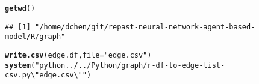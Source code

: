 \documentclass{article}\usepackage[]{graphicx}\usepackage[]{color}
\makeatletter
\newcommand{\hlstr}[1]{\textcolor[rgb]{0.192,0.494,0.8}{#1}}%
\newcommand{\hlstd}[1]{\textcolor[rgb]{0.345,0.345,0.345}{#1}}%
\newcommand{\hlkwc}[1]{\textcolor[rgb]{0.333,0.667,0.333}{#1}}%
\newcommand{\hlkwd}[1]{\textcolor[rgb]{0.737,0.353,0.396}{\textbf{#1}}}%
\newenvironment{kframe}{%
 \def\at@end@of@kframe{}%
 \ifinner\ifhmode%
  \def\at@end@of@kframe{\end{minipage}}%
  \begin{minipage}{\columnwidth}%
 \fi\fi%
 \def\FrameCommand##1{\hskip\@totalleftmargin \hskip-\fboxsep
 \colorbox{shadecolor}{##1}\hskip-\fboxsep
     \hskip-\linewidth \hskip-\@totalleftmargin \hskip\columnwidth}%
 \MakeFramed {\advance\hsize-\width
   \@totalleftmargin\z@ \linewidth\hsize
   \@setminipage}}%
 {\par\unskip\endMakeFramed%
 \at@end@of@kframe}
\newenvironment{knitrout}{}{} %
\makeatother
\begin{document}
\begin{knitrout}
\begin{kframe}
{\ttfamily\noindent\bfseries\color{errorcolor}{\#\# Error: object 'script.dir' not found}}\begin{alltt}
\hlkwd{getwd}\hlstd{()}
\end{alltt}
\begin{verbatim}
## [1] "/home/dchen/git/repast-neural-network-agent-based-model/R/graph"
\end{verbatim}
\begin{alltt}
\hlkwd{write.csv}\hlstd{(edge.df,} \hlkwc{file} \hlstd{=} \hlstr{"edge.csv"}\hlstd{)}
\hlkwd{system}\hlstd{(}\hlstr{"python ../../Python/graph/r-df-to-edge-list-csv.py \textbackslash{}"edge.csv\textbackslash{}""}\hlstd{)}
\end{alltt}
\end{kframe}
\end{knitrout}
\end{document}
